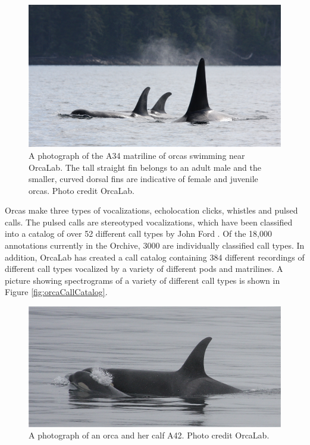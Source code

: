 \documentclass[12pt,oneside]{book}
\begin{document}
\begin{figure}[t]
\centering
\includegraphics[width=\columnwidth]{figures/orcasSwimming}
\caption{A photograph of the A34 matriline of orcas swimming near
  OrcaLab.  The tall straight fin belongs to an adult male and the
  smaller, curved dorsal fins are indicative of female and juvenile
  orcas.  Photo credit OrcaLab.}
\label{fig:orcasSwimming}
\end{figure}

Orcas make three types of vocalizations, echolocation clicks, whistles
and pulsed calls.  The pulsed calls are stereotyped vocalizations,
which have been classified into a catalog of over 52 different call
types by John Ford \cite{ford1987catalogue}.  Of the 18,000
annotations currently in the Orchive, 3000 are individually classified
call types.  In addition, OrcaLab has created a call catalog
containing 384 different recordings of different call types vocalized
by a variety of different pods and matrilines.  A picture showing
spectrograms of a variety of different call types is shown in Figure
\ref{fig:orcaCallCatalog}.


\begin{figure}[t]
\centering
\includegraphics[width=\columnwidth]{figures/orcaBaby}
\caption{A photograph of an orca and her calf A42. Photo credit OrcaLab.}
\label{fig:orcaBaby}
\end{figure}
\end{document}
